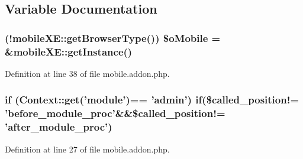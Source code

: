 \subsection{Variable Documentation}
\hypertarget{mobile_8addon_8php_a2e1472c6f1bb5b341e95a632164904d0}{
\subsubsection[{\$o\+Mobile}]{ (!{\bf mobile\+X\+E\+::get\+Browser\+Type}()) \$o\+Mobile = \&{\bf mobile\+X\+E\+::get\+Instance}()}}\label{mobile_8addon_8php_a2e1472c6f1bb5b341e95a632164904d0}


Definition at line 38 of file mobile.\+addon.\+php.

\hypertarget{mobile_8addon_8php_a13d720e0d3597438cb76873850ce4b63}{
\subsubsection[{if}]{\setlength{\rightskip}{0pt plus 5cm}if ({\bf Context\+::get}('{\bf module}')== '{\bf admin}') if(\$called\+\_\+position!= 'before\+\_\+module\+\_\+proc'\&\&\$called\+\_\+position!= 'after\+\_\+module\+\_\+proc')}}\label{mobile_8addon_8php_a13d720e0d3597438cb76873850ce4b63}


Definition at line 27 of file mobile.\+addon.\+php.

